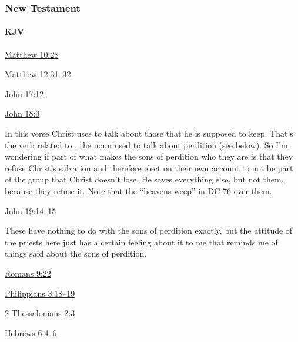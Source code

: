 		
		
	\subsubsection{New Testament} %
	
		\paragraph{KJV}
			\label{SONSOFPERDITION-NT-KJV}
			
	
			
			\begin{compactdesc}
				\item[{\hyperref[MATTHEW-10-28]{Matthew 10:28}}]
				\item[{\hyperref[MATTHEW-12-31]{Matthew 12:31--32}}]
				\item[{\hyperref[JOHN-17-12]{John 17:12}}]
				\item[{\hyperref[JOHN-18-9]{John 18:9}}] \phantom{.}
					\begin{compactitem}
						\item In this verse Christ uses  to talk about those that he is supposed to keep. That's the verb related to , the noun used to talk about perdition (see below). So I'm wondering if part of what makes the sons of perdition who they are is that they refuse Christ's salvation and therefore elect on their own account to not be part of the group that Christ doesn't lose. He saves everything else, but not them, because they refuse it. Note that the ``heavens weep'' in DC 76 over them.
					\end{compactitem}
				\item[{\hyperref[JOHN-19-14]{John 19:14--15}}] \phantom{.}
					\begin{compactitem}
						\item These have nothing to do with the sons of perdition exactly, but the attitude of the priests here just has a certain feeling about it to me that reminds me of things said about the sons of perdition.
					\end{compactitem}
				\item[{\hyperref[ROMANS-9-22]{Romans 9:22}}]
				\item[{\hyperref[PHILIPPIANS-3-18]{Philippians 3:18--19}}]
				\item[{\hyperref[2THESSALONIANS-2-3]{2 Thessalonians 2:3}}]
				\item[{\hyperref[HEBREWS-6-4]{Hebrews 6:4--6}}]
			\end{compactdesc}
			
